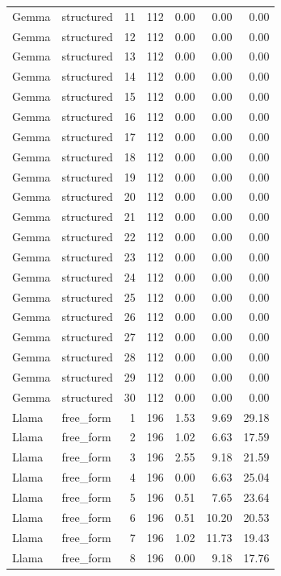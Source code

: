 \begin{longtable}{llrrrrr}
Gemma & structured & 11 & 112 & 0.00 & 0.00 & 0.00 \\
Gemma & structured & 12 & 112 & 0.00 & 0.00 & 0.00 \\
Gemma & structured & 13 & 112 & 0.00 & 0.00 & 0.00 \\
Gemma & structured & 14 & 112 & 0.00 & 0.00 & 0.00 \\
Gemma & structured & 15 & 112 & 0.00 & 0.00 & 0.00 \\
Gemma & structured & 16 & 112 & 0.00 & 0.00 & 0.00 \\
Gemma & structured & 17 & 112 & 0.00 & 0.00 & 0.00 \\
Gemma & structured & 18 & 112 & 0.00 & 0.00 & 0.00 \\
Gemma & structured & 19 & 112 & 0.00 & 0.00 & 0.00 \\
Gemma & structured & 20 & 112 & 0.00 & 0.00 & 0.00 \\
Gemma & structured & 21 & 112 & 0.00 & 0.00 & 0.00 \\
Gemma & structured & 22 & 112 & 0.00 & 0.00 & 0.00 \\
Gemma & structured & 23 & 112 & 0.00 & 0.00 & 0.00 \\
Gemma & structured & 24 & 112 & 0.00 & 0.00 & 0.00 \\
Gemma & structured & 25 & 112 & 0.00 & 0.00 & 0.00 \\
Gemma & structured & 26 & 112 & 0.00 & 0.00 & 0.00 \\
Gemma & structured & 27 & 112 & 0.00 & 0.00 & 0.00 \\
Gemma & structured & 28 & 112 & 0.00 & 0.00 & 0.00 \\
Gemma & structured & 29 & 112 & 0.00 & 0.00 & 0.00 \\
Gemma & structured & 30 & 112 & 0.00 & 0.00 & 0.00 \\
Llama & free\_form & 1 & 196 & 1.53 & 9.69 & 29.18 \\
Llama & free\_form & 2 & 196 & 1.02 & 6.63 & 17.59 \\
Llama & free\_form & 3 & 196 & 2.55 & 9.18 & 21.59 \\
Llama & free\_form & 4 & 196 & 0.00 & 6.63 & 25.04 \\
Llama & free\_form & 5 & 196 & 0.51 & 7.65 & 23.64 \\
Llama & free\_form & 6 & 196 & 0.51 & 10.20 & 20.53 \\
Llama & free\_form & 7 & 196 & 1.02 & 11.73 & 19.43 \\
Llama & free\_form & 8 & 196 & 0.00 & 9.18 & 17.76 \\

\end{longtable}
